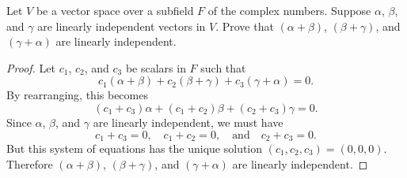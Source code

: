  Let $V$ be a vector space over a subfield $F$ of the
complex numbers. Suppose $\alpha$, $\beta$, and $\gamma$ are linearly
independent vectors in $V$. Prove that $(\alpha + \beta)$,
$(\beta + \gamma)$, and $(\gamma + \alpha)$ are linearly independent.
\begin{proof}
  Let $c_1$, $c_2$, and $c_3$ be scalars in $F$ such that
  \begin{equation*}
    c_1(\alpha + \beta) + c_2(\beta + \gamma) + c_3(\gamma + \alpha) = 0.
  \end{equation*}
  By rearranging, this becomes
  \begin{equation*}
    (c_1 + c_3)\alpha + (c_1 + c_2)\beta + (c_2 + c_3)\gamma = 0.
  \end{equation*}
  Since $\alpha$, $\beta$, and $\gamma$ are linearly independent, we
  must have
  \begin{equation*}
    c_1 + c_3 = 0, \quad c_1 + c_2 = 0,
    \quad\text{and}\quad c_2 + c_3 = 0.
  \end{equation*}
  But this system of equations has the unique solution
  $(c_1,c_2,c_3) = (0, 0, 0)$. Therefore $(\alpha + \beta)$,
  $(\beta + \gamma)$, and $(\gamma + \alpha)$ are linearly
  independent.
\end{proof}

